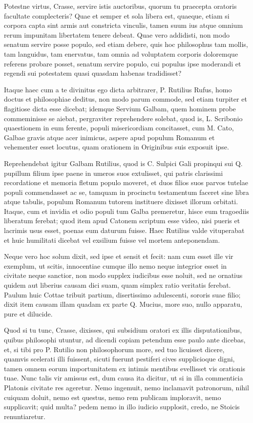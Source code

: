  Potestne virtus, Crasse, servire istis auctoribus, quorum tu praecepta oratoris facultate complecteris? Quae et semper et sola libera est, quaeque, etiam si corpora capta sint armis aut constricta vinculis, tamen suum ius atque omnium rerum impunitam libertatem tenere debeat. Quae vero addidisti, non modo senatum servire posse populo, sed etiam debere, quis hoc philosophus tam mollis, tam languidus, tam enervatus, tam omnia ad voluptatem corporis doloremque referens probare posset, senatum servire populo, cui populus ipse moderandi et regendi sui potestatem quasi quasdam habenas tradidisset?

 Itaque haec cum a te divinitus ego dicta arbitrarer, P. Rutilius Rufus, homo doctus et philosophiae deditus, non modo parum commode, sed etiam turpiter et flagitiose dicta esse dicebat; idemque Servium Galbam, quem hominem probe commeminisse se aiebat, pergraviter reprehendere solebat, quod is, L. Scribonio quaestionem in eum ferente, populi misericordiam concitasset, cum M. Cato, Galbae gravis atque acer inimicus, aspere apud populum Romanum et vehementer esset locutus, quam orationem in Originibus suis exposuit ipse.

 Reprehendebat igitur Galbam Rutilius, quod is C. Sulpici Gali propinqui sui Q. pupillum filium ipse paene in umeros suos extulisset, qui patris clarissimi recordatione et memoria fletum populo moveret, et duos filios suos parvos tutelae populi commendasset ac se, tamquam in procinctu testamentum faceret sine libra atque tabulis, populum Romanum tutorem instituere dixisset illorum orbitati. Itaque, cum et invidia et odio populi tum Galba premeretur, hisce eum tragoediis liberatum ferebat; quod item apud Catonem scriptum esse video, nisi pueris et lacrimis usus esset, poenas eum daturum fuisse. Haec Rutilius valde vituperabat et huic humilitati dicebat vel exsilium fuisse vel mortem anteponendam.

 Neque vero hoc solum dixit, sed ipse et sensit et fecit: nam cum esset ille vir exemplum, ut scitis, innocentiae cumque illo nemo neque integrior esset in civitate neque sanctior, non modo supplex iudicibus esse noluit, sed ne ornatius quidem aut liberius causam dici suam, quam simplex ratio veritatis ferebat. Paulum huic Cottae tribuit partium, disertissimo adulescenti, sororis suae filio; dixit item causam illam quadam ex parte Q. Mucius, more suo, nullo apparatu, pure et dilucide.

 Quod si tu tunc, Crasse, dixisses, qui subsidium oratori ex illis disputationibus, quibus philosophi utuntur, ad dicendi copiam petendum esse paulo ante dicebas, et, si tibi pro P. Rutilio non philosophorum more, sed tuo licuisset dicere, quamvis scelerati illi fuissent, sicuti fuerunt pestiferi cives supplicioque digni, tamen omnem eorum importunitatem ex intimis mentibus evellisset vis orationis tuae. Nunc talis vir amissus est, dum causa ita dicitur, ut si in illa commenticia Platonis civitate res ageretur. Nemo ingemuit, nemo inclamavit patronorum, nihil cuiquam doluit, nemo est questus, nemo rem publicam imploravit, nemo supplicavit; quid multa? pedem nemo in illo iudicio supplosit, credo, ne Stoicis renuntiaretur.

